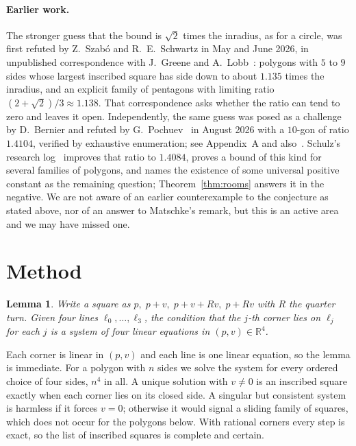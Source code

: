 \documentclass[11pt,a4paper]{article}
\newtheorem{lemma}[theorem]{Lemma}
\theoremstyle{remark}\newtheorem{remark}[theorem]{Remark}
\begin{document}
\paragraph{Earlier work.} The stronger guess that the bound is $\sqrt2$ times
the inradius, as for a circle, was first refuted by Z.~Szab\'o and
R.~E.~Schwartz in May and June 2026, in unpublished correspondence with
J.~Greene and A.~Lobb~\cite{ss}: polygons with $5$ to $9$ sides whose largest
inscribed square has side down to about $1.135$ times the inradius, and an
explicit family of pentagons with limiting ratio $(2+\sqrt2)/3\approx1.138$.
That correspondence asks whether the ratio can tend to zero and leaves it open.
Independently, the same guess was posed as a challenge by D.~Bernier and
refuted by G.~Pochuev~\cite{pochuev} in August 2026 with a $10$-gon of ratio
$1.4104$, verified by exhaustive enumeration; see Appendix~A and also~\cite{schulz}.
Schulz's research log~\cite{schulz} improves that ratio to $1.4084$, proves a
bound of this kind for several families of polygons, and names the existence of
some universal positive constant as the remaining question; Theorem~\ref{thm:rooms}
answers it in the negative. We are not aware of an earlier counterexample to the conjecture as stated above, nor of an answer to Matschke's remark, but this
is an active area and we may have missed one.

\section{Method}

\begin{lemma}\label{lem:linear}
Write a square as $p,\;p+v,\;p+v+Rv,\;p+Rv$ with $R$ the quarter turn. Given four
lines $\ell_0,\dots,\ell_3$, the condition that the $j$-th corner lies on $\ell_j$
for each $j$ is a system of four linear equations in $(p,v)\in\mathbb R^4$.
\end{lemma}

Each corner is linear in $(p,v)$ and each line is one linear equation, so the
lemma is immediate. For a polygon with $n$ sides we solve the system for every
ordered choice of four sides, $n^4$ in all. A unique solution with $v\neq0$ is an
inscribed square exactly when each corner lies on its closed side. A singular but
consistent system is harmless if it forces $v=0$; otherwise it would signal a
sliding family of squares, which does not occur for the polygons below. With
rational corners every step is exact, so the list of inscribed squares is
complete and certain.
\end{document}
